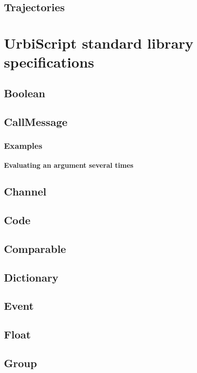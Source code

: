 \documentclass[openright,twoside,12pt]{report}
\newcommand{\us}{UrbiScript\xspace}
\begin{document}
\section{Trajectories}

\chapter{\us standard library specifications}
\label{chap:std}

\section{Boolean}
\section{CallMessage}
\label{sect:std-callmsg}
\subsection{Examples}
\subsubsection{Evaluating an argument several times}
\label{sect:std-callmsg-examples-several}
\section{Channel}
\section{Code}
\section{Comparable}
\label{sect:std-comparable}
\section{Dictionary}
\section{Event}

\section{Float}


\section{Group}
\end{document}

